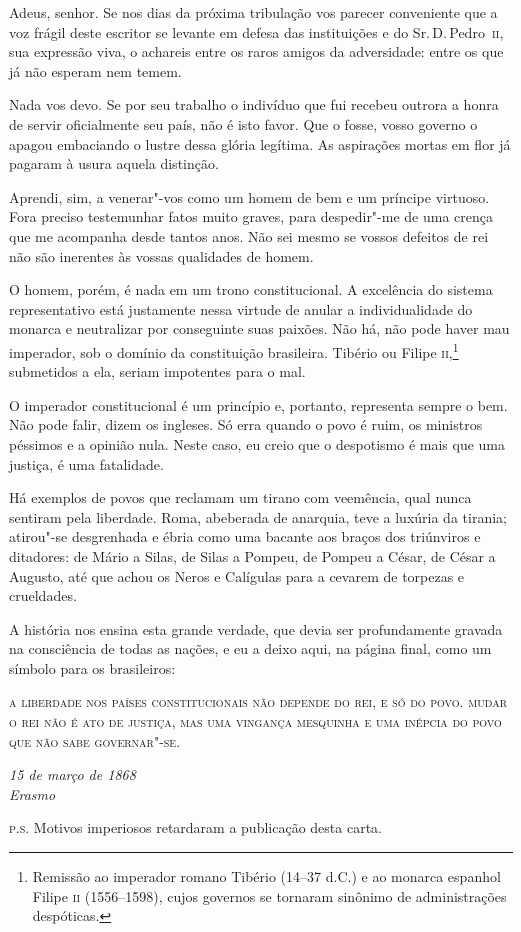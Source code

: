 \begin{linenumbers}
 Adeus, senhor. Se nos dias da próxima tribulação vos parecer
conveniente que a voz frágil deste escritor se levante em defesa das
instituições e do Sr.\,D.\,Pedro~\textsc{ii}, sua expressão viva, o achareis entre
os raros amigos da adversidade: entre os que já não esperam nem temem. 

 Nada vos devo. Se por seu trabalho o indivíduo que fui recebeu
outrora a honra de servir oficialmente seu país, não é isto favor. Que
o fosse, vosso governo o apagou embaciando o lustre dessa glória
legítima. As aspirações mortas em flor já pagaram à usura aquela distinção. 

 Aprendi, sim, a venerar"-vos como um homem de bem e um príncipe
virtuoso. Fora preciso testemunhar fatos muito graves, para
despedir"-me de uma crença que me acompanha desde tantos anos. Não sei
mesmo se vossos defeitos de rei não são inerentes às vossas qualidades	
de homem. 

 O homem, porém, é nada em um trono constitucional. A excelência do
sistema representativo está justamente nessa virtude de anular a
individualidade do monarca e neutralizar por conseguinte suas paixões.
Não há, não pode haver mau imperador, sob o domínio da constituição
brasileira. Tibério ou Filipe
\textsc{ii},\footnote{ Remissão ao
imperador romano Tibério (14--37 d.C.) e ao monarca espanhol Filipe \textsc{ii}
(1556--1598), cujos governos se tornaram sinônimo de administrações
despóticas.} submetidos a ela, seriam impotentes para o mal. 

 O imperador constitucional é um princípio e, portanto, representa
sempre o bem. Não pode falir, dizem os ingleses. Só erra quando o povo
é ruim, os ministros péssimos e a opinião nula. Neste caso, eu creio
que o despotismo é mais que uma justiça, é uma fatalidade.

 Há exemplos de povos que reclamam um tirano com veemência, qual nunca
sentiram pela liberdade. Roma, abeberada de anarquia, teve a luxúria da
tirania; atirou"-se desgrenhada e ébria como uma bacante aos braços
dos triúnviros e ditadores: de Mário a Silas, de Silas a Pompeu, de
Pompeu a César, de César a Augusto, até que achou os Neros e Calígulas
para a cevarem de torpezas e crueldades.

 A história nos ensina esta grande verdade, que devia ser profundamente
gravada na consciência de todas as nações, e eu a deixo aqui, na página
final, como um símbolo para os brasileiros:

\pagebreak 

\textsc{a liberdade nos países constitucionais não depende do rei, e só do
povo. mudar o rei não é ato de justiça, mas uma vingança mesquinha e
uma inépcia do povo que não sabe governar"-se.}

\begin{flushright}
\textit{15 de março de 1868\\
Erasmo}
\end{flushright}
 

\noindent\textsc{p.s.} Motivos imperiosos retardaram a publicação desta carta.

\end{linenumbers}


